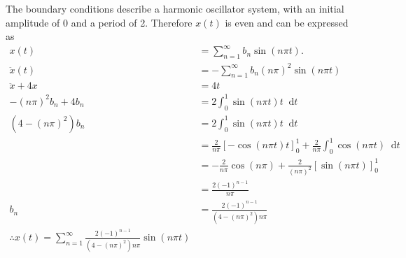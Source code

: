 \documentclass[12pt]{article}
\newcommand*\diff{\mathop{}\!\mathrm{d}}
\newenvironment{problem}[2][Problem]{\begin{trivlist}
\item[\hskip \labelsep {\bfseries #1}\hskip \labelsep {\bfseries #2.}]}{\end{trivlist}}
\begin{document}
\begin{problem}{2}
\end{problem}
The boundary conditions describe a harmonic oscillator system, with an initial
amplitude of 0 and a period of 2. Therefore $x(t)$ is even and can be expressed
as
\begin{align*}
	x(t) &= \sum_{n=1}^\infty b_n \sin (n\pi t). \\
	\ddot{x}(t) &= - \sum_{n=1}^\infty b_n (n\pi)^2 \sin (n\pi t) \\
	\ddot{x} + 4x &= 4t \\
	-(n\pi)^2 b_n + 4 b_n &= 2 \int_0^1 \sin(n\pi t) t \diff t \\
	(4 - (n\pi)^2) b_n &= 2 \int_0^1 \sin(n\pi t) t \diff t \\
	&= \frac{2}{n\pi} \left[ -\cos(n\pi t) t \right]_0^1 + \frac{2}{n\pi}
		\int_0^1 \cos(n\pi t) \diff t \\
	&= -\frac{2}{n\pi} \cos(n\pi) + \frac{2}{(n\pi)^2} \left[ \sin(n\pi t)
		\right]_0^1 \\
	&= \frac{2(-1)^{n-1}}{n\pi} \\
	b_n &= \frac{2(-1)^{n-1}}{(4-(n\pi)^2)n\pi} \\
	\therefore x(t) = \sum_{n=1}^\infty \frac{2(-1)^{n-1}}{(4-(n\pi)^2)n\pi}
		\sin (n\pi t)
\end{align*}
\end{document}
